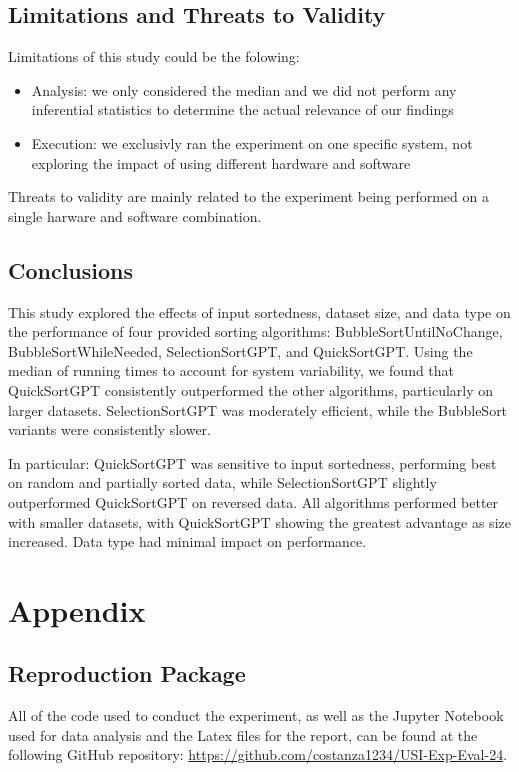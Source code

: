 \documentclass[unicode,11pt,a4paper,oneside,numbers=endperiod,openany]{scrartcl}
\begin{document}
    \subsection{Limitations and Threats to Validity}

    Limitations of this study could be the folowing:
    \begin{itemize}
        \item Analysis: we only considered the median and we did not perform any inferential statistics to determine the actual relevance of our findings
        \item Execution: we exclusivly ran the experiment on one specific system, not exploring the impact of using different hardware and software
    \end{itemize}

    Threats to validity are mainly related to the experiment being performed on a single harware and software combination.



    \subsection{Conclusions}

    This study explored the effects of input sortedness, dataset size, and data type on the performance of four provided sorting algorithms: BubbleSortUntilNoChange, BubbleSortWhileNeeded, SelectionSortGPT, and QuickSortGPT. Using the median of running times to account for system variability, we found that QuickSortGPT consistently outperformed the other algorithms, particularly on larger datasets. SelectionSortGPT was moderately efficient, while the BubbleSort variants were consistently slower.

    In particular: QuickSortGPT was sensitive to input sortedness, performing best on random and partially sorted data, while SelectionSortGPT slightly outperformed QuickSortGPT on reversed data. All algorithms performed better with smaller datasets, with QuickSortGPT showing the greatest advantage as size increased. Data type had minimal impact on performance.


\section{Appendix}

    \subsection{Reproduction Package}
    All of the code used to conduct the experiment, as well as the Jupyter Notebook used for data analysis and the Latex files for the report, can be found at the following GitHub repository: \url{https://github.com/costanza1234/USI-Exp-Eval-24}.
\end{document}
